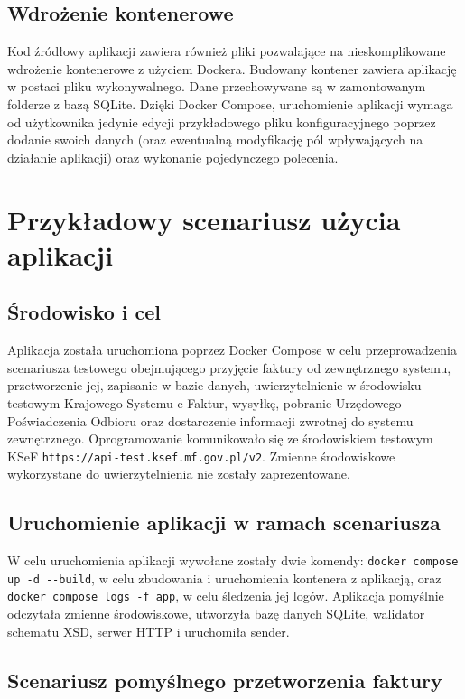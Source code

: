 \subsection{Wdrożenie kontenerowe}
Kod źródłowy aplikacji zawiera również pliki pozwalające na nieskomplikowane wdrożenie kontenerowe z użyciem Dockera. Budowany kontener zawiera aplikację w postaci pliku wykonywalnego. Dane przechowywane są w zamontowanym folderze z bazą SQLite. Dzięki Docker Compose, uruchomienie aplikacji wymaga od użytkownika jedynie edycji przykładowego pliku konfiguracyjnego poprzez dodanie swoich danych (oraz ewentualną modyfikację pól wpływających na działanie aplikacji) oraz wykonanie pojedynczego polecenia.

\section{Przykładowy scenariusz użycia aplikacji}
\subsection{Środowisko i cel}
Aplikacja została uruchomiona poprzez Docker Compose w celu przeprowadzenia scenariusza testowego obejmującego przyjęcie faktury od zewnętrznego systemu, przetworzenie jej, zapisanie w bazie danych, uwierzytelnienie w środowisku testowym Krajowego Systemu e-Faktur, wysyłkę, pobranie Urzędowego Poświadczenia Odbioru oraz dostarczenie informacji zwrotnej do systemu zewnętrznego. Oprogramowanie komunikowało się ze środowiskiem testowym KSeF \texttt{https://api-test.ksef.mf.gov.pl/v2}. Zmienne środowiskowe wykorzystane do uwierzytelnienia nie zostały zaprezentowane.

\subsection{Uruchomienie aplikacji w ramach scenariusza}
W celu uruchomienia aplikacji wywołane zostały dwie komendy: \texttt{docker compose up -d -{}-build}, w celu zbudowania i uruchomienia kontenera z aplikacją, oraz \texttt{docker compose logs -f app}, w celu śledzenia jej logów. Aplikacja pomyślnie odczytała zmienne środowiskowe, utworzyła bazę danych SQLite, walidator schematu XSD, serwer HTTP i uruchomiła sender. 

\subsection{Scenariusz pomyślnego przetworzenia faktury}

